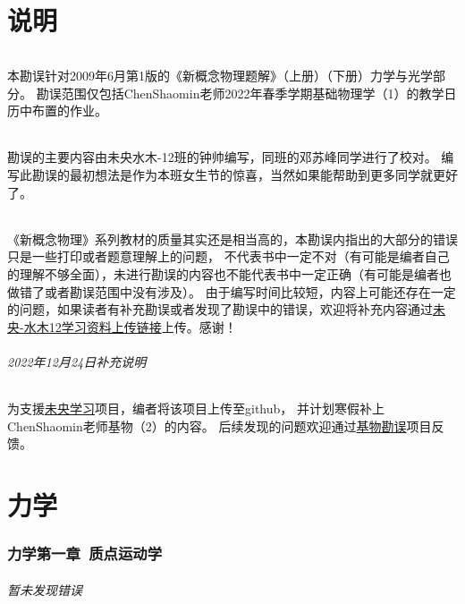 \documentclass[a4paper,11pt]{ctexart}
\begin{document}
\newpage
\tableofcontents

\newpage

\part{说明}
\paragraph{}
本勘误针对2009年6月第1版的《新概念物理题解》（上册）（下册）力学与光学部分。
勘误范围仅包括ChenShaomin老师2022年春季学期基础物理学（1）的教学日历中布置的作业。
\paragraph{}
勘误的主要内容由未央水木-12班的钟帅编写，同班的邓苏峰同学进行了校对。
编写此勘误的最初想法是作为本班女生节的惊喜，当然如果能帮助到更多同学就更好了。
\paragraph{}
《新概念物理》系列教材的质量其实还是相当高的，本勘误内指出的大部分的错误只是一些打印或者题意理解上的问题，
不代表书中一定不对（有可能是编者自己的理解不够全面），未进行勘误的内容也不能代表书中一定正确（有可能是编者也做错了或者勘误范围中没有涉及）。
由于编写时间比较短，内容上可能还存在一定的问题，如果读者有补充勘误或者发现了勘误中的错误，欢迎将补充内容通过\href{https://cloud.tsinghua.edu.cn/u/d/201c674f93ed4445929c/}{未央-水木12学习资料上传链接}上传。感谢！

\paragraph*{2022年12月24日补充说明}
为支援\href{https://weyoung-learn.github.io/}{未央学习}项目，编者将该项目上传至github，
并计划寒假补上ChenShaomin老师基物（2）的内容。
后续发现的问题欢迎通过\href{https://github.com/OscarZs/Corrigendum-to-Basic-Physics}{基物勘误}项目反馈。


\part{力学}
\section{力学第一章\ 质点运动学}
\paragraph{暂未发现错误}
\end{document}
